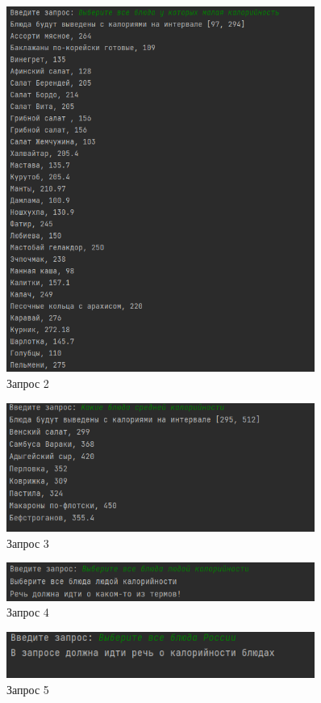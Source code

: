 \begin{figure}[h]
	\centering
	\includegraphics[width=0.9\textwidth]{img/request-2.png}
	\caption{Запрос 2}
	\label{fig:r2}
\end{figure}

\clearpage

\begin{figure}[h]
	\centering
	\includegraphics[width=0.9\textwidth]{img/request-3.png}
	\caption{Запрос 3}
	\label{fig:r3}
\end{figure}

\begin{figure}[h]
	\centering
	\includegraphics[width=0.9\textwidth]{img/request-4.png}
	\caption{Запрос 4}
	\label{fig:r4}
\end{figure}

\begin{figure}[h]
	\centering
	\includegraphics[width=0.9\textwidth]{img/request-5.png}
	\caption{Запрос 5}
	\label{fig:r5}
\end{figure}